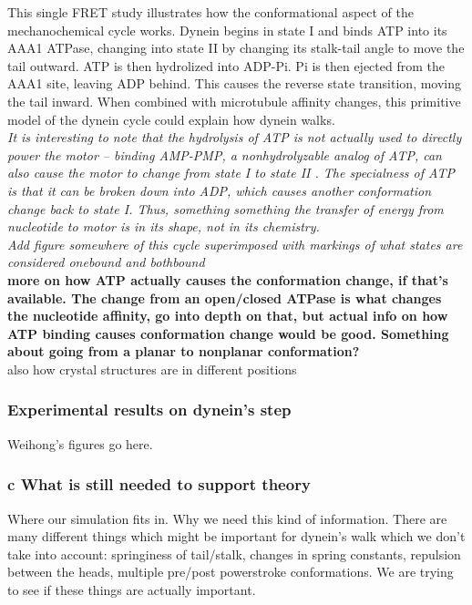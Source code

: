 \documentclass[10pt]{article} %
\begin{document}

This single FRET study illustrates how the conformational aspect of the mechanochemical cycle works. Dynein begins in state I and binds ATP into its AAA1 ATPase, changing into state II by changing its stalk-tail angle to move the tail outward. ATP is then hydrolized into ADP-Pi. Pi is then ejected from the AAA1 site, leaving ADP behind. This causes the reverse state transition, moving the tail inward. When combined with microtubule affinity changes, this primitive model of the dynein cycle could explain how dynein walks.\\

\textit{It is interesting to note that the hydrolysis of ATP is not actually used to directly power the motor -- binding AMP-PMP, a nonhydrolyzable analog of ATP, can also cause the motor to change from state I to state II \cite{FRETstatepaper}. The specialness of ATP is that it can be broken down into ADP, which causes another conformation change back to state I. Thus, something something the transfer of energy from nucleotide to motor is in its shape, not in its chemistry.}\\

\textit{Add figure somewhere of this cycle superimposed with markings of what states are considered onebound and bothbound}\\

\textbf{more on how ATP actually causes the conformation change, if that's available. The change from an open/closed ATPase is what changes the nucleotide affinity, go into depth on that, but actual info on how ATP binding causes conformation change would be good. Something about going from a planar to nonplanar conformation?}\\

also how crystal structures are in different positions

\subsubsection{Experimental results on dynein’s step}
Weihong's figures go here.\\

\subsubsection{c What is still needed to support theory}
Where our simulation fits in. Why we need this kind of information.
There are many different things which might be important for dynein's walk which we don't take into account: springiness of tail/stalk, changes in spring constants, repulsion between the heads, multiple pre/post powerstroke conformations. We are trying to see if these things are actually important.
\end{document}

